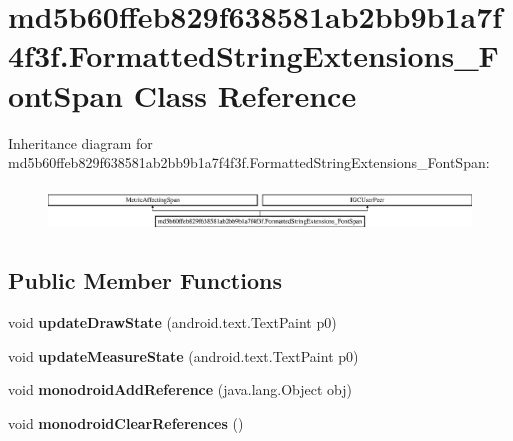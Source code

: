 \hypertarget{classmd5b60ffeb829f638581ab2bb9b1a7f4f3f_1_1FormattedStringExtensions__FontSpan}{}\section{md5b60ffeb829f638581ab2bb9b1a7f4f3f.\+Formatted\+String\+Extensions\+\_\+\+Font\+Span Class Reference}
\label{classmd5b60ffeb829f638581ab2bb9b1a7f4f3f_1_1FormattedStringExtensions__FontSpan}
Inheritance diagram for md5b60ffeb829f638581ab2bb9b1a7f4f3f.\+Formatted\+String\+Extensions\+\_\+\+Font\+Span\+:\begin{figure}[H]
\begin{center}
\leavevmode
\includegraphics[height=1.209503cm]{classmd5b60ffeb829f638581ab2bb9b1a7f4f3f_1_1FormattedStringExtensions__FontSpan}
\end{center}
\end{figure}
\subsection*{Public Member Functions}
\begin{DoxyCompactItemize}
\item 
\mbox{\label{classmd5b60ffeb829f638581ab2bb9b1a7f4f3f_1_1FormattedStringExtensions__FontSpan_a97b8c1219694dcb15d384eef823d2e26}} 
void {\bfseries update\+Draw\+State} (android.\+text.\+Text\+Paint p0)
\item 
\mbox{\label{classmd5b60ffeb829f638581ab2bb9b1a7f4f3f_1_1FormattedStringExtensions__FontSpan_a7dae2ceacb0d10c2779b20b414c80a5b}} 
void {\bfseries update\+Measure\+State} (android.\+text.\+Text\+Paint p0)
\item 
\mbox{\label{classmd5b60ffeb829f638581ab2bb9b1a7f4f3f_1_1FormattedStringExtensions__FontSpan_a943edf05988a3ee0617593770d19dc2e}} 
void {\bfseries monodroid\+Add\+Reference} (java.\+lang.\+Object obj)
\item 
\mbox{\label{classmd5b60ffeb829f638581ab2bb9b1a7f4f3f_1_1FormattedStringExtensions__FontSpan_ac530c8771610db1c7c647982314f8a4e}} 
void {\bfseries monodroid\+Clear\+References} ()
\end{DoxyCompactItemize}
